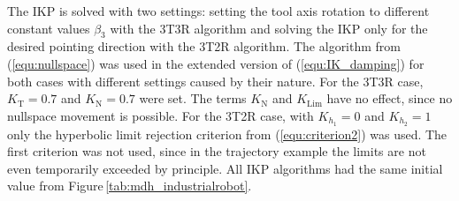\documentclass[robotics,article,accept,moreauthors,pdftex]{Definitions/mdpi}
\begin{document}
The IKP is solved with two settings: setting the tool axis rotation to different constant values $\beta_3$ with the 3T3R algorithm and solving the IKP only for the desired pointing direction with the 3T2R algorithm.
The algorithm from (\ref{equ:nullspace}) was used in the extended version of (\ref{equ:IK_damping}) for both cases with different settings caused by their nature.
For the 3T3R case, $K_\mathrm{T}=0.7$ and $K_\mathrm{N}=0.7$ were set.
The terms $K_\mathrm{N}$ and $K_\mathrm{Lim}$ have no effect, since no nullspace movement is possible.
For the 3T2R case, with $K_{h_1}=0$ and $K_{h_2}=1$ only the hyperbolic limit rejection criterion from (\ref{equ:criterion2}) was used.
The first criterion was not used, since in the trajectory example the limits are not even temporarily exceeded by principle.
All IKP algorithms had the same initial value from Figure\,\ref{tab:mdh_industrialrobot}.
\end{document}
